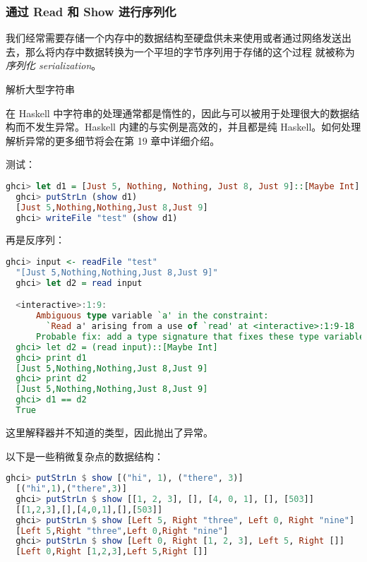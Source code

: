 \documentclass[./main.tex]{subfiles}
\begin{document}
\subsubsection*{通过 Read 和 Show 进行序列化}

我们经常需要存储一个内存中的数据结构至硬盘供未来使用或者通过网络发送出去，那么将内存中数据转换为一个平坦的字节序列用于存储的这个过程
就被称为\textit{序列化 serialization}。

\begin{anote}
  解析大型字符串

  在 Haskell 中字符串的处理通常都是惰性的，因此与可以被用于处理很大的数据结构而不发生异常。Haskell
  内建的与实例是高效的，并且都是纯 Haskell。如何处理解析异常的更多细节将会在第 19 章中详细介绍。
\end{anote}

测试：

\begin{lstlisting}[language=Haskell]
  ghci> let d1 = [Just 5, Nothing, Nothing, Just 8, Just 9]::[Maybe Int]
  ghci> putStrLn (show d1)
  [Just 5,Nothing,Nothing,Just 8,Just 9]
  ghci> writeFile "test" (show d1)
\end{lstlisting}

再是反序列：

\begin{lstlisting}[language=Haskell]
  ghci> input <- readFile "test"
  "[Just 5,Nothing,Nothing,Just 8,Just 9]"
  ghci> let d2 = read input

  <interactive>:1:9:
      Ambiguous type variable `a' in the constraint:
        `Read a' arising from a use of `read' at <interactive>:1:9-18
      Probable fix: add a type signature that fixes these type variable(s)
  ghci> let d2 = (read input)::[Maybe Int]
  ghci> print d1
  [Just 5,Nothing,Nothing,Just 8,Just 9]
  ghci> print d2
  [Just 5,Nothing,Nothing,Just 8,Just 9]
  ghci> d1 == d2
  True
\end{lstlisting}

这里解释器并不知道的类型，因此抛出了异常。

以下是一些稍微复杂点的数据结构：

\begin{lstlisting}[language=Haskell]
  ghci> putStrLn $ show [("hi", 1), ("there", 3)]
  [("hi",1),("there",3)]
  ghci> putStrLn $ show [[1, 2, 3], [], [4, 0, 1], [], [503]]
  [[1,2,3],[],[4,0,1],[],[503]]
  ghci> putStrLn $ show [Left 5, Right "three", Left 0, Right "nine"]
  [Left 5,Right "three",Left 0,Right "nine"]
  ghci> putStrLn $ show [Left 0, Right [1, 2, 3], Left 5, Right []]
  [Left 0,Right [1,2,3],Left 5,Right []]
\end{lstlisting}
\end{document}
